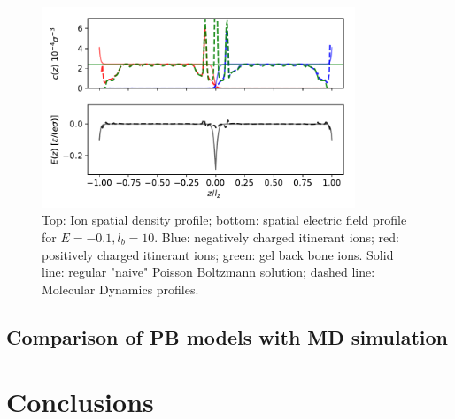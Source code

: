 \documentclass[twoside,twocolumn,9pt]{article}
\begin{document}
\begin{figure}[h]
\centering
  \includegraphics[height=6cm]{fig/Compare_E-01_lb10.pdf}
  \caption{Top: Ion spatial density profile; bottom: spatial electric field profile for $E=-0.1, l_b=10$. Blue: negatively charged itinerant ions; red: positively charged itinerant ions; green: gel back bone ions. Solid line: regular "naive" Poisson Boltzmann solution; dashed line: Molecular Dynamics profiles.}
  \label{fig:e-01_lb10}
\end{figure}
\subsection{Comparison of PB models with MD simulation}


\section{Conclusions}



\balance


\end{document}
